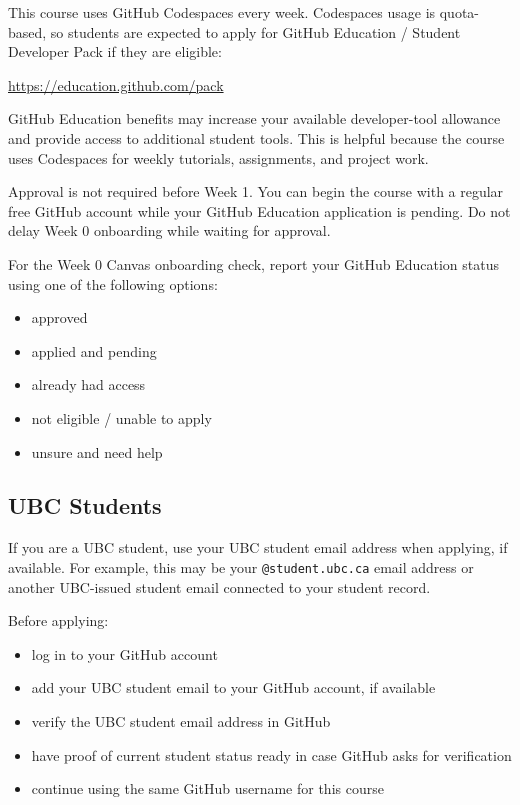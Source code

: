 \documentclass[
  letterpaper,
  DIV=11,
  numbers=noendperiod,
  oneside]{scrreprt}
\providecommand{\tightlist}{%
  \setlength{\itemsep}{0pt}\setlength{\parskip}{0pt}}
\begin{document}

This course uses GitHub Codespaces every week. Codespaces usage is
quota-based, so students are expected to apply for GitHub Education /
Student Developer Pack if they are eligible:

\url{https://education.github.com/pack}

GitHub Education benefits may increase your available developer-tool
allowance and provide access to additional student tools. This is
helpful because the course uses Codespaces for weekly tutorials,
assignments, and project work.

Approval is not required before Week 1. You can begin the course with a
regular free GitHub account while your GitHub Education application is
pending. Do not delay Week 0 onboarding while waiting for approval.

For the Week 0 Canvas onboarding check, report your GitHub Education
status using one of the following options:

\begin{itemize}
\tightlist
\item
  approved
\item
  applied and pending
\item
  already had access
\item
  not eligible / unable to apply
\item
  unsure and need help
\end{itemize}

\subsection*{UBC Students}\label{ubc-students}

If you are a UBC student, use your UBC student email address when
applying, if available. For example, this may be your
\texttt{@student.ubc.ca} email address or another UBC-issued student
email connected to your student record.

Before applying:

\begin{itemize}
\tightlist
\item
  log in to your GitHub account
\item
  add your UBC student email to your GitHub account, if available
\item
  verify the UBC student email address in GitHub
\item
  have proof of current student status ready in case GitHub asks for
  verification
\item
  continue using the same GitHub username for this course
\end{itemize}
\end{document}
